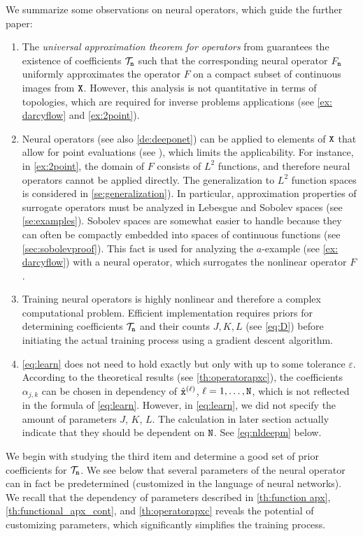 \documentclass[10pt]{article}
\numberwithin{equation}{section}
\theoremstyle{nonumberplain}
\newcommand{\ve}{\varepsilon}
\newcommand{\X}{{\tt X}}
\newcommand{\n}{{\tt n}}
\newcommand{\x}{{\tt x}}
\newcommand{\no}{{\tt N}}
\begin{document}
We summarize some observations on neural operators, which guide the further paper:
\begin{enumerate}
	\item The \emph{universal approximation theorem for operators} from \cite{TiaHon95,LuJinPanZhaKar21} guarantees the existence of coefficients 
	$\mathcal{T}_\n$ such that the corresponding neural operator $F_\n$ uniformly approximates the operator $F$ on a compact subset of continuous images from $\X$. However, this analysis is not quantitative in terms of topologies, which are required for inverse problems applications (see \autoref{ex: darcyflow} and \autoref{ex:2point}).
	\item Neural operators (see also \autoref{de:deeponet}) can be applied to elements of $\X$ that allow for point evaluations (see \cite{WanWanPer21}), which limits the applicability. For instance, in \autoref{ex:2point}, the domain of $F$ consists of $L^2$ functions, and therefore neural operators cannot be applied directly. The generalization to $L^2$ function spaces is considered in \autoref{se:generalization}). In particular, approximation properties of surrogate operators must be analyzed in Lebesgue and Sobolev spaces (see \autoref{se:examples}). Sobolev spaces are somewhat easier to handle because they can often be compactly embedded into spaces of continuous functions (see \autoref{sec:sobolevproof}). This fact is used for analyzing the $a$-example (see \autoref{ex: darcyflow}) with a neural operator, which surrogates the nonlinear operator $F$. 
    \item Training neural operators is highly nonlinear and therefore a complex computational problem. Efficient implementation requires priors for determining coefficients $\mathcal{T}_\n$ and their counts $J, K, L$ (see \autoref{eq:D}) before initiating the actual training process using a gradient descent algorithm. 
    \item \autoref{eq:learn} does not need to hold exactly but only with up to some tolerance $\ve$. According to the theoretical results (see \autoref{th:operatorapxc}), the coefficients $\alpha_{j,k}$ can be chosen in dependency of $\hat{\x}^{(\ell)}$, $\ell = 1,\ldots,\no$, which is not reflected in the formula of \autoref{eq:learn}. However, in \autoref{eq:learn}, we did not specify the amount of parameters $J$, $K$, $L$. The calculation in later section actually indicate that they should be dependent on $\no$. See \autoref{eq:nldeepm} below.
\end{enumerate}
We begin with studying the third item and determine a good set of prior coefficients for $\mathcal{T}_\n$. We see below that several parameters of the neural operator can in fact be predetermined (customized in the language of neural networks). We recall that the dependency of parameters described in \autoref{th:function apx}, \autoref{th:functional_apx_cont}, and \autoref{th:operatorapxc} reveals the potential of customizing parameters, which significantly simplifies the training process.
\end{document}
